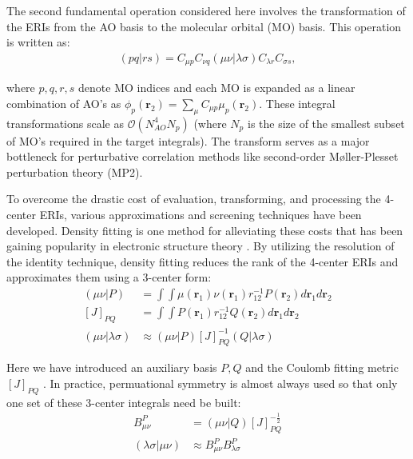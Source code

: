 The second fundamental operation considered here involves the transformation of the ERIs from the AO basis 
to the molecular orbital (MO) basis. This operation is written as:
\begin{align}
(pq | rs) = C_{\mu p}C_{ \nu q}
(\mu \nu | \lambda \sigma)C_{\lambda r}C_{\sigma s},
\end{align} 

\noindent where $p,q,r,s$ denote MO indices and each MO is expanded as a linear combination of AO's as 
$\phi_p(\textbf{r}_{2})=\sum_\mu C_{\mu p} \mu_p(\textbf{r}_{2})$.
These integral transformations scale 
as $\mathcal{O}(N_{AO}^4N_p)$ (where $N_p$ is the size of the smallest subset of MO's required in the target integrals). 
The transform serves as a major 
bottleneck for perturbative correlation methods like second-order M{\o}ller-Plesset perturbation theory (MP2).

To overcome the drastic cost of evaluation, transforming, and processing the 4-center ERIs, various approximations 
and screening techniques have been developed. 
Density fitting \cite{Whitten:1973:4496, Dunlap:1977:81, Dunlap:1979:3396, Dunlap:1979:4993, Kendall:1997:158}
is one method for alleviating these costs that has been gaining popularity in electronic structure theory 
\cite{Sherrill:2010:110902, Feyereisen:1993:359, Weigend:2002:4285, ref4, ref5}.
By utilizing the resolution of the identity technique, 
density fitting reduces the rank of the 4-center ERIs and approximates them using a 3-center form: 
\begin{align} 
(\mu \nu|P) &= \int \int \mu(\textbf{r}_{1}) 
\nu(\textbf{r}_{1}) r^{-1}_{12} P(\textbf{r}_{2}) d\textbf{r}_{1} d\textbf{r}_{2} \\
[J]_{PQ} &= \int \int P(\textbf{r}_1)r_{12}^{-1}Q(\textbf{r}_2) d{\textbf{r}_{1}}d{\textbf{r}_{2}} \\
(\mu \nu|\lambda \sigma) &\approx (\mu \nu| P)[J]_{PQ}^{-1}(Q|\lambda \sigma)  
\end{align} 

\noindent Here we have introduced an auxiliary basis $P, Q$ and the Coulomb fitting metric $[J]_{PQ}$ \cite{ref2}. 
In practice, permuational symmetry is almost always used so that only one set of these 3-center integrals need be built:
\begin{align} 
B_{\mu \nu}^P &= (\mu \nu | Q)[J]_{PQ}^{-\frac{1}{2}}  \\ 
(\lambda \sigma | \mu \nu) &\approx  B_{\mu \nu}^P B_{\lambda \sigma}^P  \end{align} 

